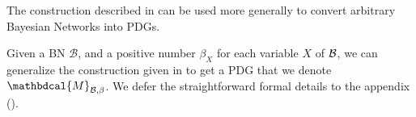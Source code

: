 \documentclass{article}
\theoremstyle{plain}
\theoremstyle{definition}
\theoremstyle{remark}
\newcommand{\dg}[1]{\mathbdcal{#1}}
\newcommand{\PDGof}[1]{{\dg M}_{#1}}
\numberwithin{equation}{section}
\begin{document}
The construction described in  can be used more
generally to convert arbitrary Bayesian Networks into PDGs.
\begin{defn}[BN to PDG]
	Given a BN $\mathcal B$, and a positive number $\beta_X$ for
        each variable $X$ of $\cal B$,
we can generalize the construction given in  to get a
PDG that we denote $\PDGof{\mathcal B, \beta}$.  We defer the
straightforward formal details
to the appendix ().
\end{defn}
\end{document}
